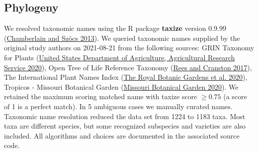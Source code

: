 \documentclass[
  10pt,
]{article}
\begin{document}
\hypertarget{phylogeny}{%
\subsection{Phylogeny}\label{phylogeny}}

We resolved taxonomic names using the R package \textbf{taxize} version 0.9.99 (\protect\hyperlink{ref-chamberlain_taxize_2013}{Chamberlain and Szöcs 2013}). We queried taxonomic names supplied by the original study authors on 2021-08-21 from the following sources: GRIN Taxonomy for Plants (\protect\hyperlink{ref-united_states_department_of_agriculture_agricultural_research_service_germplasm_2020}{United States Department of Agriculture, Agricultural Research Service 2020}), Open Tree of Life Reference Taxonomy (\protect\hyperlink{ref-rees_automated_2017}{Rees and Cranston 2017}), The International Plant Names Index (\protect\hyperlink{ref-the_royal_botanic_gardens_international_2020}{The Royal Botanic Gardens et al. 2020}), Tropicos - Missouri Botanical Garden (\protect\hyperlink{ref-missouri_botanical_garden_tropicos_2020}{Missouri Botanical Garden 2020}). We retained the maximum scoring matched name with taxize score \(\ge 0.75\) (a score of 1 is a perfect match). In 5 ambiguous cases we manually curated names. Taxonomic name resolution reduced the data set from 1224 to 1183 taxa. Most taxa are different species, but some recognized subspecies and varieties are also included. All algorithms and choices are documented in the associated source code.
\end{document}

